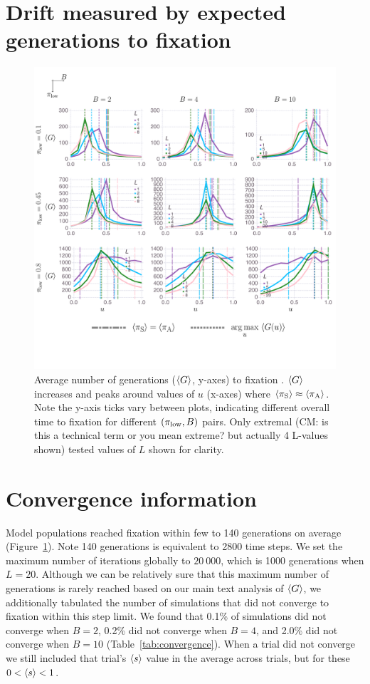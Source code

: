 \documentclass[letterpaper,11.5pt]{scrartcl}
\newcommand{\cm}[1]{{\textcolor{mypurple} {({\tiny CM:} #1)}}}
\begin{document}
\section{Drift measured by expected generations to fixation}
\begin{figure}
  \caption{Average number of generations ($\langle G \rangle$, y-axes) to fixation . 
    $\langle G \rangle$ increases and peaks around values of $u$ (x-axes) where
  $\langle \pi_\mathrm{S} \rangle \approx \langle \pi_\mathrm{A} \rangle$. Note the y-axis ticks vary between plots,
indicating different overall time to fixation for different $(\pi_{\mathrm{low}}, B)$
pairs. Only extremal \cm{is this a technical term or you mean extreme? but actually 4 L-values shown} tested values of $L$ shown for clarity.} 
  \label{fig:steps}
\centering
    \includegraphics[width=\textwidth]{Figures/stepResultsPlots.pdf}
\end{figure}

\clearpage

\section{Convergence information}

Model populations reached fixation within few to 140 generations on
average (Figure~\ref{fig:steps}).
Note 140 generations is equivalent to 2800 time steps. We set the maximum 
number of iterations globally to $20~000$, which is 1000 generations when
$L=20$. Although we can be relatively sure that this maximum number of 
generations is rarely reached based on our main text analysis of $\langle G \rangle$,
we additionally tabulated the number of simulations that did not converge to
fixation
within this step limit. We found that 0.1\% of simulations did not converge
when $B=2$, 0.2\% did not converge when $B=4$, and 2.0\% did not converge
when $B=10$ (Table~\ref{tab:convergence}). When a trial did not converge we
still included that trial's $\langle s \rangle$ value in the average across trials,
but for these $0 < \langle s \rangle < 1$.
\end{document}
